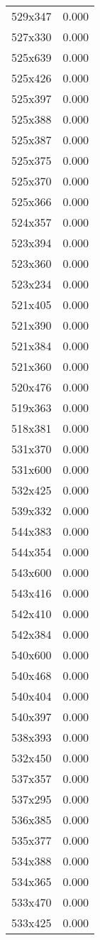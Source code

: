 \begin{table}
\begin{tabular}{lr}
529x347 & 0.000 \\
527x330 & 0.000 \\
525x639 & 0.000 \\
525x426 & 0.000 \\
525x397 & 0.000 \\
525x388 & 0.000 \\
525x387 & 0.000 \\
525x375 & 0.000 \\
525x370 & 0.000 \\
525x366 & 0.000 \\
524x357 & 0.000 \\
523x394 & 0.000 \\
523x360 & 0.000 \\
523x234 & 0.000 \\
521x405 & 0.000 \\
521x390 & 0.000 \\
521x384 & 0.000 \\
521x360 & 0.000 \\
520x476 & 0.000 \\
519x363 & 0.000 \\
518x381 & 0.000 \\
531x370 & 0.000 \\
531x600 & 0.000 \\
532x425 & 0.000 \\
539x332 & 0.000 \\
544x383 & 0.000 \\
544x354 & 0.000 \\
543x600 & 0.000 \\
543x416 & 0.000 \\
542x410 & 0.000 \\
542x384 & 0.000 \\
540x600 & 0.000 \\
540x468 & 0.000 \\
540x404 & 0.000 \\
540x397 & 0.000 \\
538x393 & 0.000 \\
532x450 & 0.000 \\
537x357 & 0.000 \\
537x295 & 0.000 \\
536x385 & 0.000 \\
535x377 & 0.000 \\
534x388 & 0.000 \\
534x365 & 0.000 \\
533x470 & 0.000 \\
533x425 & 0.000 \\

\end{tabular}
\end{table}
